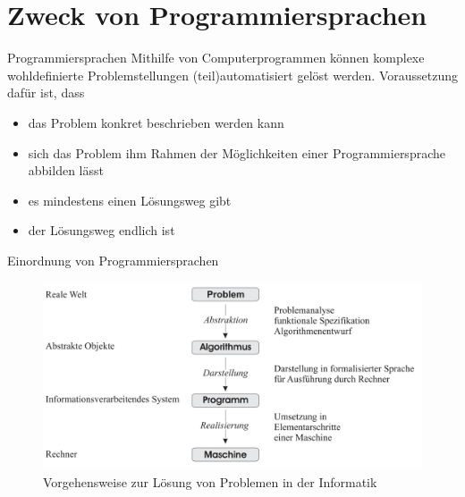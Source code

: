 \newcommand{\decktitle}{Programmiersprachen}

%
%


		
		
\section{Zweck von Programmiersprachen}		
    \begin{frame}{Programmiersprachen}
        Mithilfe von Computerprogrammen können komplexe wohldefinierte Problemstellungen (teil)automatisiert gelöst werden. Voraussetzung dafür ist, dass
        \begin{itemize}
            \item das Problem konkret beschrieben werden kann
            \item sich das Problem ihm Rahmen der Möglichkeiten einer Programmiersprache abbilden lässt
            \item es mindestens einen Lösungsweg gibt
            \item der Lösungsweg endlich ist
        \end{itemize}
    \end{frame}  
    
    \begin{frame}{Einordnung von Programmiersprachen}
        \begin{figure}
            \centering
            \includegraphics[width=\linewidth,height=0.5\textheight,keepaspectratio]{chapters/04_programming_languages/figures/problem2solution.png}
            \caption{Vorgehensweise zur Lösung von Problemen in der Informatik \cite{Muller2015}}
        \end{figure}
    \end{frame}
    

